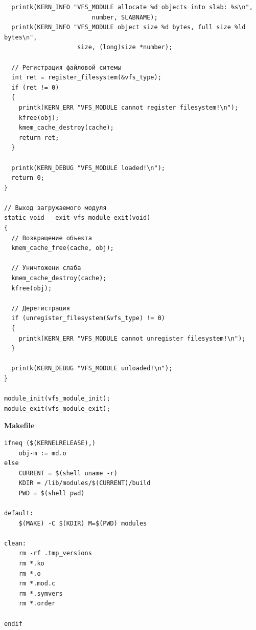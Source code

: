 \documentclass[a4paper,14pt]{extreport} %
\begin{document}
\begin{lstlisting}
  printk(KERN_INFO "VFS_MODULE allocate %d objects into slab: %s\n", 
  						number, SLABNAME);
  printk(KERN_INFO "VFS_MODULE object size %d bytes, full size %ld bytes\n", 
  					size, (long)size *number);

  // Регистрация файловой ситемы
  int ret = register_filesystem(&vfs_type);
  if (ret != 0)
  {
    printk(KERN_ERR "VFS_MODULE cannot register filesystem!\n");
    kfree(obj);
    kmem_cache_destroy(cache);
    return ret;
  }

  printk(KERN_DEBUG "VFS_MODULE loaded!\n");
  return 0;
}

// Выход загружаемого модуля
static void __exit vfs_module_exit(void)
{
  // Возвращение объекта
  kmem_cache_free(cache, obj);
  
  // Уничтожени слаба
  kmem_cache_destroy(cache);
  kfree(obj);

  // Дерегистрация
  if (unregister_filesystem(&vfs_type) != 0)
  {
    printk(KERN_ERR "VFS_MODULE cannot unregister filesystem!\n");
  }

  printk(KERN_DEBUG "VFS_MODULE unloaded!\n");
}

module_init(vfs_module_init);
module_exit(vfs_module_exit);
\end{lstlisting}

\textbf{Makefile}

\begin{lstlisting}
ifneq ($(KERNELRELEASE),)
	obj-m := md.o
else
	CURRENT = $(shell uname -r)
	KDIR = /lib/modules/$(CURRENT)/build
	PWD = $(shell pwd)

default:
	$(MAKE) -C $(KDIR) M=$(PWD) modules

clean:
	rm -rf .tmp_versions
	rm *.ko
	rm *.o
	rm *.mod.c
	rm *.symvers
	rm *.order

endif
\end{lstlisting}
\end{document}
